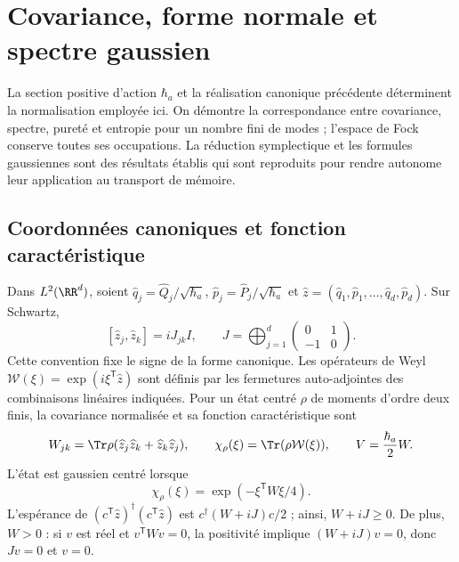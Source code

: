 \chapter{Covariance, forme normale et spectre gaussien}
\label{x_reciprocidad:app:gaussianas-espectro}

La section positive d’action \(\hbar_a\) et la réalisation canonique
précédente déterminent la normalisation employée ici. On démontre la
correspondance entre covariance, spectre, pureté et entropie pour un
nombre fini de modes ; l’espace de Fock conserve toutes ses occupations.
La réduction symplectique et les formules gaussiennes sont des résultats
établis qui sont reproduits pour rendre autonome leur application au
transport de mémoire.

\section{Coordonnées canoniques et fonction caractéristique}
Dans \(L^2(\RR^d)\), soient \(\widehat q_j=\widehat Q_j/\sqrt{\hbar_a}\),
\(\widehat p_j=\widehat P_j/\sqrt{\hbar_a}\) et
\(\widehat z=(\widehat q_1,\widehat p_1,\ldots,\widehat q_d,\widehat p_d)\).
Sur Schwartz,
\[
 [\widehat z_j,\widehat z_k]=iJ_{jk}I,\qquad
 J=\bigoplus_{j=1}^d\begin{pmatrix}0&1\\-1&0\end{pmatrix}.
\]
Cette convention fixe le signe de la forme canonique. Les opérateurs de
Weyl \(\mathcal W(\xi)=\exp(i\xi^{\mathsf T}\widehat z)\) sont définis
par les fermetures auto-adjointes des combinaisons linéaires indiquées.
Pour un état centré \(\rho\) de moments d’ordre deux finis, la
covariance normalisée et sa fonction caractéristique sont
\[
 W_{jk}=\Tr\rho(\widehat z_j\widehat z_k+\widehat z_k\widehat z_j),
 \qquad \chi_\rho(\xi)=\Tr(\rho\mathcal W(\xi)),\qquad
 V=\frac{\hbar_a}{2}W.
\]
L’état est gaussien centré lorsque
\begin{equation}
 \chi_\rho(\xi)=\exp(-\xi^{\mathsf T}W\xi/4).
 \label{x_reciprocidad:app:eq:caracteristica-gaussiana}
\end{equation}
L’espérance de \((c^{\mathsf T}\widehat z)^\dagger
(c^{\mathsf T}\widehat z)\) est \(c^\dagger(W+iJ)c/2\) ; ainsi,
\(W+iJ\geq0\). De plus, \(W>0\) : si \(v\) est réel et
\(v^{\mathsf T}Wv=0\), la positivité implique \((W+iJ)v=0\),
donc \(Jv=0\) et \(v=0\).


